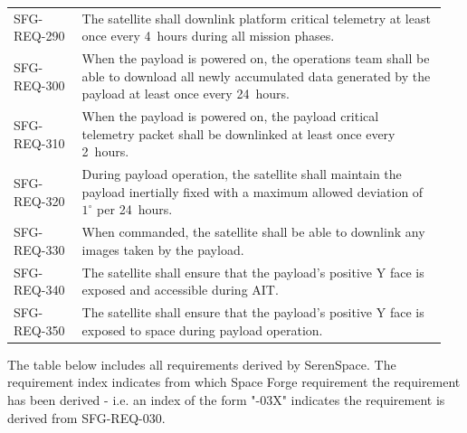 \documentclass[a4paper, 11pt, conference]{IEEEtran}
\begin{document}
{\begin{longtable}{@{}p{0.15\linewidth}p{0.80\linewidth}@{}}
SFG-REQ-290 & The satellite shall downlink platform critical telemetry at least once every 4~hours during all mission phases. \\
SFG-REQ-300 & When the payload is powered on, the operations team shall be able to download all newly accumulated data generated by the payload at least once every 24~hours. \\
SFG-REQ-310 & When the payload is powered on, the payload critical telemetry packet shall be downlinked at least once every 2~hours. \\
SFG-REQ-320 & During payload operation, the satellite shall maintain the payload inertially fixed with a maximum allowed deviation of $1^\circ$ per 24~hours. \\
SFG-REQ-330 & When commanded, the satellite shall be able to downlink any images taken by the payload. \\
SFG-REQ-340 & The satellite shall ensure that the payload's positive Y face is exposed and accessible during AIT. \\
SFG-REQ-350 & The satellite shall ensure that the payload's positive Y face is exposed to space during payload operation. \\
\bottomrule

\end{longtable}
}

\vspace{5pt}

The table below includes all requirements derived by SerenSpace. The requirement index indicates from which Space Forge requirement the requirement has been derived - i.e. an index of the form "-03X" indicates the requirement is derived from SFG-REQ-030.
\end{document}
